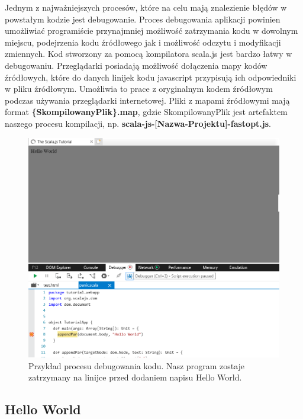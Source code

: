 Jednym z najważniejszych procesów, które na celu mają znalezienie błędów w powstałym kodzie jest debugowanie. Proces debugowania aplikacji powinien umożliwiać programiście przynajmniej możliwość zatrzymania kodu w dowolnym miejscu, podejrzenia kodu źródłowego jak i możliwość odczytu i modyfikacji zmiennych.
Kod stworzony za pomocą kompilatora scala.js jest bardzo łatwy w debugowaniu. Przeglądarki posiadają możliwość dołączenia mapy kodów źródłowych, które do danych linijek kodu javascript przypisują ich odpowiedniki w pliku źródłowym. Umożliwia to prace z oryginalnym kodem źródłowym podczas używania przeglądarki internetowej. 
Pliki z mapami źródłowymi mają format \textbf{\{SkompilowanyPlik\}.map}, gdzie SkompilowanyPlik jest artefaktem naszego procesu kompilacji, np.  \textbf{scala-js-[Nazwa-Projektu]-fastopt.js}. 
\begin{figure}[h]
	\centering
	\includegraphics[width=\textwidth]{images/debug.png}
	 \caption[Przykład procesu debugowania kodu. Nasz program zostaje zatrzymany na linijce przed dodaniem napisu Hello World.]
	 {Przykład procesu debugowania kodu. Nasz program zostaje zatrzymany na linijce przed dodaniem napisu Hello World. \footnotemark}
\end{figure}



\subsection{Hello World}

